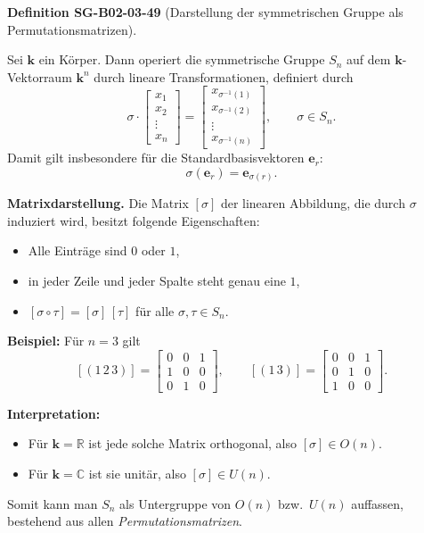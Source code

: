 \documentclass[10pt, letterpaper]{article}
\newcommand{\CustomHeading}[3]{%
  \par\medskip\noindent%
  \textbf{#1 #2} \textnormal{(#3)}.\enskip%
}
\newenvironment{DEF}[2]{\begin{unitbox}\CustomHeading{Definition}{#1}{#2}}{\end{unitbox}}
\begin{document}
\begin{DEF}{SG-B02-03-49}{Darstellung der symmetrischen Gruppe als Permutationsmatrizen}
Sei \(\mathbf{k}\) ein Körper. Dann operiert die symmetrische Gruppe
\(S_n\) auf dem \(\mathbf{k}\)-Vektorraum \(\mathbf{k}^n\) durch lineare
Transformationen, definiert durch
\[
\sigma\cdot
\begin{bmatrix}
x_1\\x_2\\\vdots\\x_n
\end{bmatrix}
=
\begin{bmatrix}
x_{\sigma^{-1}(1)}\\x_{\sigma^{-1}(2)}\\\vdots\\x_{\sigma^{-1}(n)}
\end{bmatrix},
\qquad \sigma\in S_n.
\]
Damit gilt insbesondere für die Standardbasisvektoren
\(\mathbf{e}_r\):
\[
\sigma(\mathbf{e}_r)=\mathbf{e}_{\sigma(r)}.
\]

\textbf{Matrixdarstellung.}
Die Matrix \([\sigma]\) der linearen Abbildung, die durch \(\sigma\)
induziert wird, besitzt folgende Eigenschaften:
\begin{itemize}
\item Alle Einträge sind \(0\) oder \(1\),
\item in jeder Zeile und jeder Spalte steht genau eine \(1\),
\item \([\sigma\circ\tau]=[\sigma]\,[\tau]\) für alle \(\sigma,\tau\in S_n\).
\end{itemize}

\textbf{Beispiel:} Für \(n=3\) gilt
\[
\left[(1\,2\,3)\right]=
\begin{bmatrix}
0 & 0 & 1\\
1 & 0 & 0\\
0 & 1 & 0
\end{bmatrix},
\qquad
\left[(1\,3)\right]=
\begin{bmatrix}
0 & 0 & 1\\
0 & 1 & 0\\
1 & 0 & 0
\end{bmatrix}.
\]

\textbf{Interpretation:}
\begin{itemize}
\item Für \(\mathbf{k}=\mathbb{R}\) ist jede solche Matrix orthogonal, also
\([\sigma]\in O(n)\).
\item Für \(\mathbf{k}=\mathbb{C}\) ist sie unitär, also
\([\sigma]\in U(n)\).
\end{itemize}

Somit kann man \(S_n\) als Untergruppe von \(O(n)\) bzw.\ \(U(n)\)
auffassen, bestehend aus allen \emph{Permutationsmatrizen}.
\end{DEF}
\end{document}
